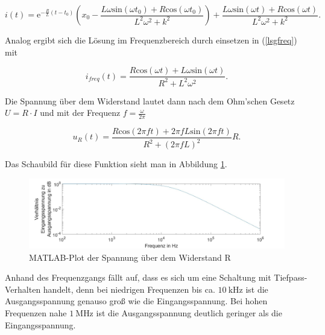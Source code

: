 \begin{equation*}
	i(t) = \mathrm{e}^{-\frac{R}{L}(t-t_0)}\left(x_0-\frac{L\omega \mathrm{sin}(\omega t_0)+R\mathrm{cos}(\omega t_0)}{L^2\omega^2+k^2}\right)+\frac{L\omega \mathrm{sin}(\omega t)+R\mathrm{cos}(\omega t)}{L^2\omega^2+k^2}.
\end{equation*}

Analog ergibt sich die Lösung im Frequenzbereich durch einsetzen in (\ref{lsgfreq}) mit

\begin{equation*}
	i_{freq} (t) = \frac{R\mathrm{cos}(\omega t) + L\omega\mathrm{sin}(\omega t)}{R^2+ L^2\omega^2}.
\end{equation*}

Die Spannung über dem Widerstand lautet dann nach dem Ohm'schen Gesetz $U=R\cdot I$ und mit der Frequenz $f=\frac{\omega}{2\pi}$

\begin{equation*}
u_{R} (t) = \frac{R\mathrm{cos}(2\pi ft) + 2\pi fL\mathrm{sin}(2\pi ft)}{R^2+ (2\pi fL)^2}R.
\end{equation*}

Das Schaubild für diese Funktion sieht man in Abbildung \ref{spannungplot}.

\begin{figure}[h]
	\includegraphics[width=\textwidth]{data/nocheinversuch.jpg}
	\caption{MATLAB-Plot der Spannung über dem Widerstand R}
	\label{spannungplot}
\end{figure}

Anhand des Frequenzgangs fällt auf, dass es sich um eine Schaltung mit Tiefpass-Verhalten handelt, denn bei niedrigen Frequenzen bis ca. $\SI{10}{\kilo\hertz}$ ist die Ausgangsspannung genauso groß wie die Eingangsspannung. Bei hohen Frequenzen nahe $\SI{1}{\mega \hertz}$ ist die Ausgangsspannung deutlich geringer als die Eingangsspannung.




